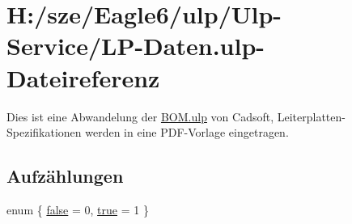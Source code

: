 \hypertarget{_l_p-_daten_8ulp}{}\section{H\+:/sze/\+Eagle6/ulp/\+Ulp-\/\+Service/\+L\+P-\/\+Daten.ulp-\/\+Dateireferenz}
\label{_l_p-_daten_8ulp}


Dies ist eine Abwandelung der \hyperlink{bom_8ulp}{B\+O\+M.\+ulp} von Cadsoft, Leiterplatten-\/ Spezifikationen werden in eine P\+D\+F-\/\+Vorlage eingetragen.  


\subsection*{Aufzählungen}
\begin{DoxyCompactItemize}
\item 
enum \{ \hyperlink{_l_p-_daten_8ulp_a06fc87d81c62e9abb8790b6e5713c55bae9de385ef6fe9bf3360d1038396b884c}{false} = 0, 
\hyperlink{_l_p-_daten_8ulp_a06fc87d81c62e9abb8790b6e5713c55ba08f175a5505a10b9ed657defeb050e4b}{true} = 1
 \}
\end{DoxyCompactItemize}
